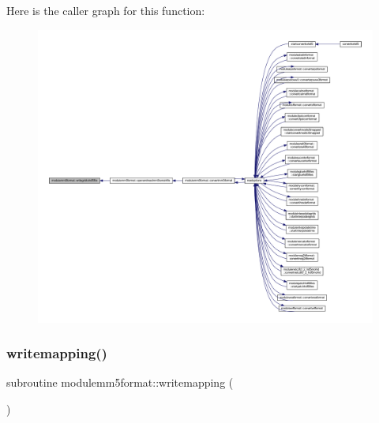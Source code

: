 Here is the caller graph for this function\+:\nopagebreak
\begin{figure}[H]
\begin{center}
\leavevmode
\includegraphics[width=350pt]{namespacemodulemm5format_a752f2b2f864f9d5601283baf96f7397f_icgraph}
\end{center}
\end{figure}
\mbox{\label{namespacemodulemm5format_ab8eb4353dbcd1d51f336675a6f66b0e6}} 
\subsubsection{\texorpdfstring{writemapping()}{writemapping()}}
{\footnotesize\ttfamily subroutine modulemm5format\+::writemapping (\begin{DoxyParamCaption}{ }\end{DoxyParamCaption})\hspace{0.3cm}{\ttfamily [private]}}

